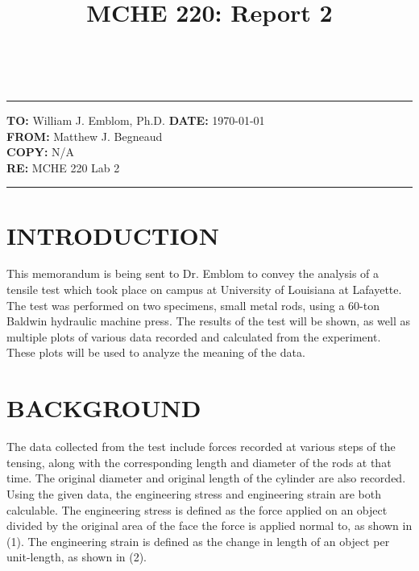 \documentclass[12pt]{article}
\title{MCHE 220: Report 2}
\begin{document}
\raggedright     %
\fancyhf{}  
  \renewcommand{\headrulewidth}{0pt}
    \pagestyle{plain}
    
\captionsetup[table]{labelsep=space}

\begin{flushleft}
\hrulefill\\\hrule height 1pt
\vspace{5pt}
\textbf{TO: }William J. Emblom, Ph.D.  \hfill   \textbf{DATE: }\today                
\bigskip\\
\textbf{FROM: }Matthew J. Begneaud
\bigskip\\
\textbf{COPY: }N/A
\bigskip\\
\textbf{RE: }MCHE 220 Lab 2
\vspace{-10pt}
\end{flushleft}
\hrulefill \hrule height 1pt


\section*{\fontsize{12}{12}\selectfont INTRODUCTION}
This memorandum is being sent to Dr. Emblom to convey the analysis of a tensile test which took place on campus at University of Louisiana at Lafayette. The test was performed on two specimens, small metal rods, using a 60-ton Baldwin hydraulic machine press. The results of the test will be shown, as well as multiple plots of various data recorded and calculated from the experiment. These plots will be used to analyze the meaning of the data.
\bigskip


\section*{\fontsize{12}{12}\selectfont BACKGROUND}
The data collected from the test include forces recorded at various steps of the tensing, along with the corresponding length and diameter of the rods at that time. The original diameter and original length of the cylinder are also recorded. Using the given data, the engineering stress and engineering strain are both calculable. The engineering stress is defined as the force applied on an object divided by the original area of the face the force is applied normal to, as shown in (1). The engineering strain is defined as the change in length of an object per unit-length, as shown in (2).
\end{document}
